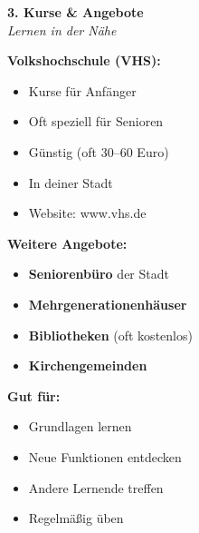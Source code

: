 \documentclass[a4paper,landscape,8pt]{extarticle}
\begin{document}
\begin{minipage}[t]{0.32\linewidth}
\begin{center}
\colorbox{vhsorange!15}{%
\begin{minipage}{0.95\linewidth}
\vspace{2mm}
\begin{center}
{\Large\bfseries\textcolor{vhsorange}{3. Kurse \& Angebote}}\\[1pt]
{\footnotesize\itshape Lernen in der Nähe}
\end{center}
\vspace{2mm}
\end{minipage}%
}
\end{center}

\vspace{1mm}

\textbf{Volkshochschule (VHS):}
\begin{itemize}
\item Kurse für Anfänger
\item Oft speziell für Senioren
\item Günstig (oft 30--60 Euro)
\item In deiner Stadt
\item Website: www.vhs.de
\end{itemize}

\textbf{Weitere Angebote:}
\begin{itemize}
\item \textbf{Seniorenbüro} der Stadt
\item \textbf{Mehrgenerationenhäuser}
\item \textbf{Bibliotheken} (oft kostenlos)
\item \textbf{Kirchengemeinden}
\end{itemize}

\textbf{Gut für:}
\begin{itemize}
\item Grundlagen lernen
\item Neue Funktionen entdecken
\item Andere Lernende treffen
\item Regelmäßig üben
\end{itemize}

\vspace{2mm}

\end{minipage}
\end{document}

